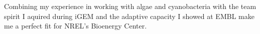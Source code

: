\documentclass[11pt,a4paper,sans]{moderncv}
\begin{document}
\begin{spacing}{1.15}
Combining my experience in working with algae and cyanobacteria with the team spirit I aquired during iGEM and the adaptive capacity I showed at EMBL make me a perfect fit for NREL's Bioenergy Center.\par\vspace*{1mm} %




\end{spacing}
\end{document}
